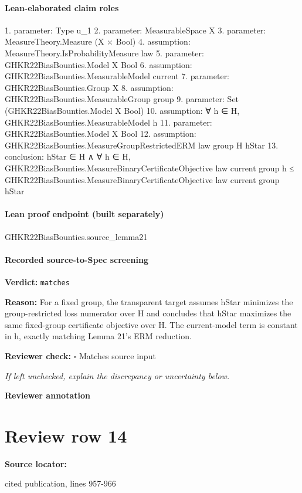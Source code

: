 \documentclass[10pt]{article}
\newcommand{\reviewerbox}{%
  \par\noindent\fbox{\parbox{0.96\linewidth}{\rule{0pt}{0.38in}}}\par
}
\newcommand{\reviewmatch}[1]{%
  \par\noindent\textbf{Reviewer check:} $\square$\; #1\par
  \noindent\emph{If left unchecked, explain the discrepancy or uncertainty below.}\par
}
\begin{document}
\paragraph{Lean-elaborated claim roles}\begin{ReviewVerbatim}
1. parameter: Type u_1
2. parameter: MeasurableSpace X
3. parameter: MeasureTheory.Measure (X × Bool)
4. assumption: MeasureTheory.IsProbabilityMeasure law
5. parameter: GHKR22BiasBounties.Model X Bool
6. assumption: GHKR22BiasBounties.MeasurableModel current
7. parameter: GHKR22BiasBounties.Group X
8. assumption: GHKR22BiasBounties.MeasurableGroup group
9. parameter: Set (GHKR22BiasBounties.Model X Bool)
10. assumption: ∀ h ∈ H, GHKR22BiasBounties.MeasurableModel h
11. parameter: GHKR22BiasBounties.Model X Bool
12. assumption: GHKR22BiasBounties.MeasureGroupRestrictedERM law group H hStar
13. conclusion: hStar ∈ H ∧
  ∀ h ∈ H,
    GHKR22BiasBounties.MeasureBinaryCertificateObjective law current group h ≤
      GHKR22BiasBounties.MeasureBinaryCertificateObjective law current group hStar
\end{ReviewVerbatim}

\paragraph{Lean proof endpoint (built separately)}\begin{ReviewVerbatim}
GHKR22BiasBounties.source_lemma21
\end{ReviewVerbatim}

\paragraph{Recorded source-to-Spec screening}
\textbf{Verdict:} \texttt{matches}
\\
{\raggedright
\textbf{Reason:} For a fixed group, the transparent target assumes hStar minimizes the group-\allowbreak{}restricted loss numerator over H and concludes that hStar maximizes the same fixed-\allowbreak{}group certificate objective over H.\allowbreak{} The current-\allowbreak{}model term is constant in h, exactly matching Lemma 21's ERM reduction.\allowbreak{}
\par}
\reviewmatch{Matches source input}
\noindent\textbf{Reviewer annotation}\par
\reviewerbox
\clearpage
\hypertarget{source-claim-05d0f899160647e9}{}
\section*{Review row 14}
\textbf{Source locator:} {\footnotesize\raggedright cited publication, lines 957-\allowbreak{}966\par}
\end{document}

